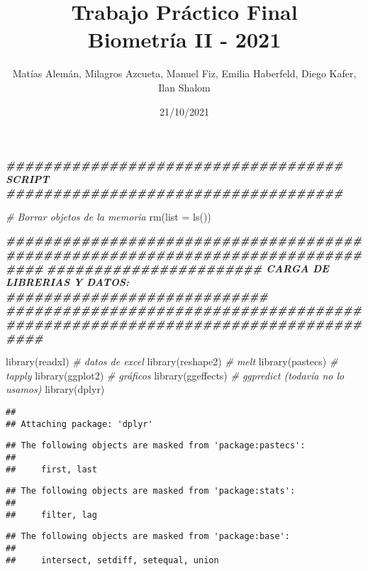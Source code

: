 \documentclass[
]{article}
\title{Trabajo Práctico Final\\
Biometría II - 2021}
\author{Matías Alemán, Milagros Azcueta, Manuel Fiz, Emilia Haberfeld,
Diego Kafer, Ilan Shalom}
\date{21/10/2021}
\newenvironment{Shaded}{\begin{snugshade}}{\end{snugshade}}
\newcommand{\AttributeTok}[1]{\textcolor[rgb]{0.77,0.63,0.00}{#1}}
\newcommand{\CommentTok}[1]{\textcolor[rgb]{0.56,0.35,0.01}{\textit{#1}}}
\newcommand{\DocumentationTok}[1]{\textcolor[rgb]{0.56,0.35,0.01}{\textbf{\textit{#1}}}}
\newcommand{\FunctionTok}[1]{\textcolor[rgb]{0.00,0.00,0.00}{#1}}
\newcommand{\NormalTok}[1]{#1}
\begin{document}
\maketitle

\begin{Shaded}
\begin{Highlighting}[]
\DocumentationTok{\#\#\#\#\#\#\#\#\#\#\#\#\#\#\#\#\#\#\#\#\#\#\#\#\#\#\#\#\#\#\#\#\#\#\#\# SCRIPT \#\#\#\#\#\#\#\#\#\#\#\#\#\#\#\#\#\#\#\#\#\#\#\#\#\#\#\#\#\#\#\#\#\#\#\#}

\CommentTok{\# Borrar objetos de la memoria}
\FunctionTok{rm}\NormalTok{(}\AttributeTok{list =} \FunctionTok{ls}\NormalTok{()) }

\DocumentationTok{\#\#\#\#\#\#\#\#\#\#\#\#\#\#\#\#\#\#\#\#\#\#\#\#\#\#\#\#\#\#\#\#\#\#\#\#\#\#\#\#\#\#\#\#\#\#\#\#\#\#\#\#\#\#\#\#\#\#\#\#\#\#\#\#\#\#\#\#\#\#\#\#\#\#\#\#\#\#\#\#}
\DocumentationTok{\#\#\#\#\#\#\#\#\#\#\#\#\#\#\#\#\#\#\#\#\#\#\# CARGA DE LIBRERIAS Y DATOS: \#\#\#\#\#\#\#\#\#\#\#\#\#\#\#\#\#\#\#\#\#\#\#\#\#\#\#\#}
\DocumentationTok{\#\#\#\#\#\#\#\#\#\#\#\#\#\#\#\#\#\#\#\#\#\#\#\#\#\#\#\#\#\#\#\#\#\#\#\#\#\#\#\#\#\#\#\#\#\#\#\#\#\#\#\#\#\#\#\#\#\#\#\#\#\#\#\#\#\#\#\#\#\#\#\#\#\#\#\#\#\#\#\#}

\FunctionTok{library}\NormalTok{(readxl)    }\CommentTok{\# datos de excel}
\FunctionTok{library}\NormalTok{(reshape2)  }\CommentTok{\# melt}
\FunctionTok{library}\NormalTok{(pastecs)   }\CommentTok{\# tapply}
\FunctionTok{library}\NormalTok{(ggplot2)   }\CommentTok{\# gráficos}
\FunctionTok{library}\NormalTok{(ggeffects) }\CommentTok{\# ggpredict (todavía no lo usamos)}
\FunctionTok{library}\NormalTok{(dplyr)}
\end{Highlighting}
\end{Shaded}

\begin{verbatim}
## 
## Attaching package: 'dplyr'
\end{verbatim}

\begin{verbatim}
## The following objects are masked from 'package:pastecs':
## 
##     first, last
\end{verbatim}

\begin{verbatim}
## The following objects are masked from 'package:stats':
## 
##     filter, lag
\end{verbatim}

\begin{verbatim}
## The following objects are masked from 'package:base':
## 
##     intersect, setdiff, setequal, union
\end{verbatim}
\end{document}
